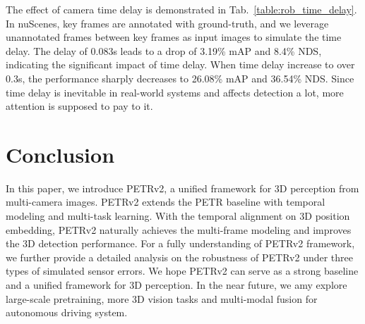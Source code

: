 \documentclass[10pt,twocolumn,letterpaper]{article}
\begin{document}
The effect of camera time delay is demonstrated in Tab.~\ref{table:rob_time_delay}. In nuScenes, key frames are annotated with ground-truth, and we leverage unannotated frames between key frames as input images to simulate the time delay. 
The delay of 0.083s leads to a drop of 3.19\% mAP and 8.4\% NDS, indicating the significant impact of time delay. When time delay increase to over 0.3s, the performance sharply decreases to 26.08\% mAP and 36.54\% NDS.
Since time delay is inevitable in real-world systems and affects detection a lot, more attention is supposed to pay to it.

\begin{table}[h]
    \caption{The performance impact (on mAP metric) of camera time delay. Here, the time delay unit s.}
    \label{table:rob_time_delay}
\end{table}















\section{Conclusion}
In this paper, we introduce PETRv2, a unified framework for 3D perception from multi-camera images. PETRv2 extends the PETR baseline with temporal modeling and multi-task learning. With the temporal alignment on 3D position embedding, PETRv2 naturally achieves the multi-frame modeling and improves the 3D detection performance.
For a fully understanding of PETRv2 framework, we further provide a detailed analysis on the robustness of PETRv2 under three types of simulated sensor errors. We hope PETRv2 can serve as a strong baseline and a unified framework for 3D perception. In the near future, we amy explore large-scale pretraining, more 3D vision tasks and multi-modal fusion for autonomous driving system.

{\small

 
}
\end{document}
